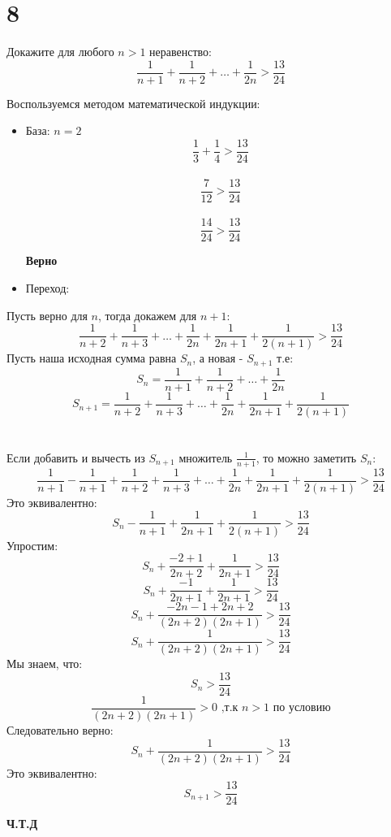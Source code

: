 \documentclass[a4paper,12pt]{article}
\begin{document}
\section*{8} 
Докажите для  любого $ n > 1 $ неравенство:
\[
\frac{1}{n+1} + \frac{1}{n+2} + \ldots  + \frac{1}{2n}  > \frac{13}{24}
\]
\begin{center}
Воспользуемся методом математической индукции:
\end{center}
\begin{itemize}
\item База: $ n = 2 $
\[
\frac{1}{3} + \frac{1}{4} > \frac{13}{24}
\]
\\
\[
\frac{7}{12} > \frac{13}{24}
\]
\\
\[
\frac{14}{24} > \frac{13}{24}
\]
\begin{center}
 \textbf{Верно}
\end{center}

\item Переход:
\end{itemize} 
Пусть верно для $n$, тогда докажем для $n+1$:
\[
\frac{1}{n+2} + \frac{1}{n+3} + 
\ldots + \frac{1}{2n} + \frac{1}{2n+1} + \frac{1}{2(n+1)} > \frac{13}{24}
\]
Пусть наша исходная сумма равна $S_n$, а новая - $S_{n+1}$ т.е:
\[
S_n = \frac{1}{n+1} + \frac{1}{n+2} + \ldots  + \frac{1}{2n}
\]
\[S_{n+1} = \frac{1}{n+2} + \frac{1}{n+3} + 
\ldots + \frac{1}{2n} + \frac{1}{2n+1} + \frac{1}{2(n+1)}\]
\\\\
Если добавить и вычесть из $S_{n+1}$ множитель $\frac{1}{n+1}$, то можно заметить $S_n$:
\[
\frac{1}{n+1} - \frac{1}{n+1} + \frac{1}{n+2} + \frac{1}{n+3} + 
\ldots + \frac{1}{2n} + \frac{1}{2n+1} + \frac{1}{2(n+1)} > \frac{13}{24}
\]
Это эквивалентно:
\[
S_n - \frac{1}{n+1} + \frac{1}{2n+1} + \frac{1}{2(n+1)} > \frac{13}{24}
\]
Упростим:
\[
S_n + \frac{-2 + 1}{2n+2} + \frac{1}{2n+1} > \frac{13}{24}
\]
\[
S_n + \frac{-1}{2n+1} + \frac{1}{2n+1} > \frac{13}{24}
\]
\[
S_n + \frac{-2n-1 + 2n+2}{(2n+2)(2n+1)} > \frac{13}{24}
\]
\[
S_n + \frac{1}{(2n+2)(2n+1)} > \frac{13}{24}
\]
Мы знаем, что:
\[
S_n > \frac{13}{24}\]
\[
\frac{1}{(2n+2)(2n+1)} > 0
\text{ ,т.к }  n > 1 \text{ по условию}
\]
Следовательно верно: 
\[
S_n + \frac{1}{(2n+2)(2n+1)} > \frac{13}{24}
\]
Это эквивалентно:
\[
S_{n+1} > \frac{13}{24}
\]
\begin{center}
\textbf{Ч.Т.Д}
\end{center}
\end{document}
